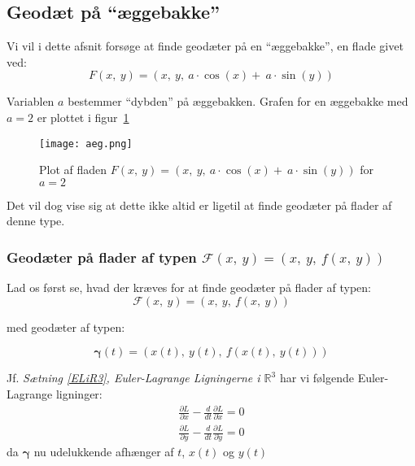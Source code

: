 \newcommand\ddiff[1]{\ddot{#1}}
\newcommand\diff[1]{\dot{#1}}

\subsection{ Geodæt på ``æggebakke'' }
Vi vil i dette afsnit forsøge at finde geodæter på en ``æggebakke'',
en flade givet ved:
\begin{equation}\label{eq:aeggebakke}
F(x,~y) = (x,~y,~a \cdot \cos(x)+~a \cdot \sin(y))
\end{equation}

Variablen \(a\) bestemmer ``dybden'' på æggebakken.
Grafen for en æggebakke med \(a = 2\) er plottet i figur~\ref{fig:aeg}
\begin{figure}[h!]
  \centering
    \texttt{[image: aeg.png]}
    \caption{Plot af fladen \(F(x,~y) = (x,~y,~a \cdot \cos(x)+~a \cdot \sin(y))\) for \(a=2\)}\label{fig:aeg}
\end{figure}
Det vil dog vise sig at dette ikke altid er ligetil at finde geodæter på flader af denne type.

\subsubsection{Geodæter på flader af typen \(\mathscr{F}(x,~y) = (x,~y,~f(x,~y))\)}
Lad os først se, hvad der kræves for at finde geodæter på flader af typen:
\begin{equation*}
\mathscr{F}(x,~y) = (x,~y,~f(x,~y))
\end{equation*}

med geodæter af typen:

\begin{equation} \label{eq:geodFlade}
\pmb{\gamma}(t) = (x(t),~y(t),~f(x(t),~y(t)))
\end{equation}

Jf. \emph{Sætning \ref{ELiR3}, Euler-Lagrange Ligningerne i $\mathbb{R}^3$} har vi følgende Euler-Lagrange ligninger:
\begin{equation} \label{eq:ELPlanFlade}
\begin{gathered}
\frac{\partial L}{\partial x} - \frac{d}{dt}\frac{\partial L}{\partial \diff{x}} = 0\\
\frac{\partial L}{\partial y} - \frac{d}{dt}\frac{\partial L}{\partial \diff{y}} = 0
\end{gathered}
\end{equation}
da \(\pmb{\gamma}\) nu udelukkende afhænger af $t$, $x(t)$ og $y(t)$

